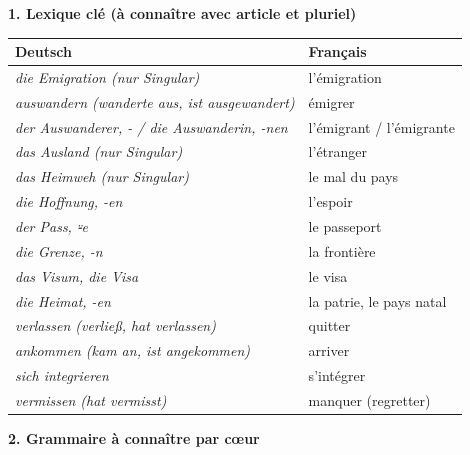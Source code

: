 \documentclass[11pt]{article}
\newcommand{\all}[1]{\ifmmode\text{\textit{#1}}\else\begingroup\selectlanguage{ngerman}\itshape #1\endgroup\fi}
\begin{document}
\begin{bilan}
\textbf{1. Lexique clé (à connaître avec article et pluriel)}

\begin{tabularx}{\linewidth}{|X|X|}\hline
\rowcolor{popblueL} \textbf{Deutsch} & \textbf{Français} \\ \hline
\all{die Emigration} (nur Singular) & l'émigration \\ \hline
\all{auswandern} (wanderte aus, ist ausgewandert) & émigrer \\ \hline
\all{der Auswanderer, -} / \all{die Auswanderin, -nen} & l'émigrant / l'émigrante \\ \hline
\all{das Ausland} (nur Singular) & l'étranger \\ \hline
\all{das Heimweh} (nur Singular) & le mal du pays \\ \hline
\all{die Hoffnung, -en} & l'espoir \\ \hline
\all{der Pass, ⸚e} & le passeport \\ \hline
\all{die Grenze, -n} & la frontière \\ \hline
\all{das Visum, die Visa} & le visa \\ \hline
\all{die Heimat, -en} & la patrie, le pays natal \\ \hline
\all{verlassen} (verließ, hat verlassen) & quitter \\ \hline
\all{ankommen} (kam an, ist angekommen) & arriver \\ \hline
\all{sich integrieren} & s'intégrer \\ \hline
\all{vermissen} (hat vermisst) & manquer (regretter) \\ \hline
\end{tabularx}

\textbf{2. Grammaire à connaître par cœur}


\end{bilan}
\end{document}
